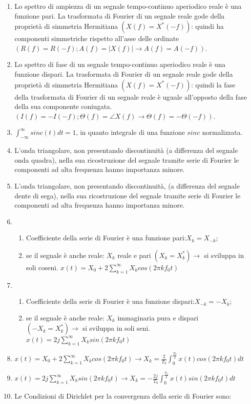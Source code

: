 \documentclass[
]{article}
\providecommand{\tightlist}{%
  \setlength{\itemsep}{0pt}\setlength{\parskip}{0pt}}
\begin{document}
\begin{enumerate}
\item
  Lo spettro di ampiezza di un segnale tempo-continuo aperiodico reale è
  una funzione pari. La trasformata di Fourier di un segnale reale gode
  della proprietà di simmetria Hermitiana \((X(f) = X^*(-f))\): quindi
  ha componenti simmetriche rispetto all'asse delle ordinate
  \((R(f)=R(-f); A(f)=|X(f)| \to A(f)=A(-f))\).
\item
  Lo spettro di fase di un segnale tempo-continuo aperiodico reale è una
  funzione dispari. La trasformata di Fourier di un segnale reale gode
  della proprietà di simmetria Hermitiana \((X(f) = X^*(-f))\): quindi
  la fase della trasformata di Fourier di un segnale reale è uguale
  all'opposto della fase della sua componente coniugata.
  \((I(f)=-I(-f); \Theta(f)=\angle X(f) \to \Theta(f)=-\Theta(-f))\).
\item
  \(\displaystyle \int_{-\infty}^\infty sinc(t)dt = 1\), in quanto
  integrale di una funzione \(sinc\) normalizzata.
\item
  L'onda triangolare, non presentando discontinuità (a differenza del
  segnale onda quadra), nella sua ricostruzione del segnale tramite
  serie di Fourier le componenti ad alta frequenza hanno importanza
  minore.
\item
  L'onda triangolare, non presentando discontinuità, (a differenza del
  segnale dente di sega), nella sua ricostruzione del segnale tramite
  serie di Fourier le componenti ad alta frequenza hanno importanza
  minore.
\item
  \begin{enumerate}
  \def\labelenumii{\arabic{enumii}.}
  \tightlist
  \item
    Coefficiente della serie di Fourier è una funzione
    pari:\(X_k = X_{-k}\);
  \item
    se il segnale è anche reale: \(X_k\) reale e pari
    \((X_k = X^*_k) \to\) si sviluppa in soli coseni.
    \(\displaystyle x(t)= X_0 + 2 \sum_{k=1}^{\infty} X_k cos (2\pi k f_0 t)\)
  \end{enumerate}
\item
  \begin{enumerate}
  \def\labelenumii{\arabic{enumii}.}
  \tightlist
  \item
    Coefficiente della serie di Fourier è una funzione
    dispari:\(X_{-k} = -X_{k}\);
  \item
    se il segnale è anche reale: \(X_k\) immaginaria pura e dispari
    \((-X_k = X^*_k) \to\) si sviluppa in soli seni.
    \(\displaystyle x(t)= 2j \sum_{k=1}^{\infty} X_k sin (2\pi k f_0 t)\)
  \end{enumerate}
\item
  \(\displaystyle x(t)=X_0 + 2\sum_{k=1}^{\infty} X_k cos (2\pi k f_0 t) \to X_k = \frac{2}{T_0} \int_{0}^{\frac{T_0}{2}} x(t) cos (2\pi k f_0 t) dt\)
\item
  \(\displaystyle x(t)= 2j \sum_{k=1}^{\infty} X_k sin (2\pi k f_0 t) \to X_k = -\frac{2j}{T_0} \int_{0}^{\frac{T_0}{2}} x(t) sin (2\pi k f_0 t)dt\)
\item
  Le Condizioni di Dirichlet per la convergenza della serie di Fourier
  sono:


\end{enumerate}
\end{document}
